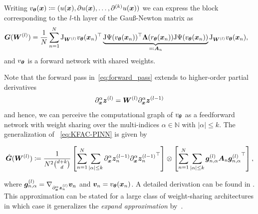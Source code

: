 Writing $v_\vtheta(\vx)\coloneqq (%
u(\vx), \partial u(\vx), \dots, \partial^{(k)} u(\vx))$
we can express the block corresponding to the $l$-th layer of the Gauß-Newton matrix as 
\begin{align}
    {\bm{G}}({\bm{W}}^{(l)}) & = \frac1N\sum_{n=1}^N \mathrm{J}_{{\bm{W}}^{(l)}} v_{\bm{\theta}}({\bm{x}}_n)^\top \underbrace{\mathrm{J} \Psi(v_{\bm{\theta}}({\bm{x}}_n))^\top {\bm{\Lambda}}(r_{\bm{\theta}}({\bm{x}}_n)) \mathrm{J} \Psi(v_{\bm{\theta}}({\bm{x}}_n))}_{\eqqcolon {\bm{A}}_n}  \mathrm{J}_{{\bm{W}}^{(l)}} v_{\bm{\theta}}({\bm{x}}_n),
\end{align}
and $v_{\bm{\theta}}$ is a forward network with shared weights.

Note that the forward pass in~\eqref{eq:forward_pass} extends to higher-order partial derivatives 
\begin{align}
    \partial_{\bm{x}}^\alpha {\bm{z}}^{(l)} = {\bm{W}}^{(l)}\partial_{\bm{x}}^\alpha {\bm{z}}^{(l-1)} 
\end{align}
and hence, we can perceive the computational graph of $v_{\bm{\theta}}$ as a feedforward network with weight sharing over the multi-indices $\alpha\in\mathbb N$ with $\lvert \alpha \rvert \le k$.
The generalization of%
~\eqref{eq:KFAC-PINN} is given by 
\begin{tcolorbox}[colframe=kfac, title={KFAC with general PDE terms},bottom=0mm,top=0mm,middle=0mm]
\begin{align}\label{eq:KFAC-PINNs-general}
    \hat{\mG}%
    (\mW^{(l)})
    \coloneqq \frac{1}{N^2 \binom{d+k}{d}}
    \left[\sum_{n=1}^N \sum_{\lvert \alpha \rvert \le k} %
    \partial_\vx^\alpha \vz_n^{(l-1)} {\partial_\vx^\alpha \vz_n^{(l-1)}}^\top\right] 
    \otimes
    \left[\sum_{n=1}^N\sum_{\lvert \alpha \rvert \le k} \vg^{(l)}_{n,\alpha} \mA_n {\vg^{(l)}_{n,\alpha}}^\top   \right],
\end{align}
\end{tcolorbox}


where ${\bm{g}}^{(l)}_{n,\alpha} = \nabla_{\partial_{\bm{x}}^\alpha {\bm{z}}_n^{(l)}} {\bm{v}}_n$ and $\vv_n = v_\vtheta(\vx_n) %
$. 
A detailed derivation can be found in .
%
This approximation can be stated for a large class of weight-sharing architectures in which case it generalizes the \emph{expand approximation} by~\citet{eschenhagen2023kroneckerfactored}. 

